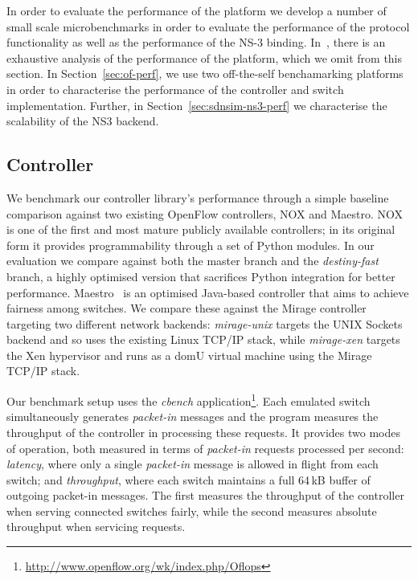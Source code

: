 In order to evaluate the performance of the \sdnsim platform we develop a number
of small scale microbenchmarks in order to evaluate the performance of the \of
protocol functionality as well as the performance of the NS-3 binding.
In~\cite{unikernel}, there is an exhaustive analysis of the performance of the
\mirage platform, which we omit from this section. In Section~\ref{sec:of-perf},
we use two off-the-self \of benchamarking platforms in order to characterise the 
performance of the controller and switch implementation. Further, in
Section~\ref{sec:sdnsim-ns3-perf} we characterise the scalability of the NS3 
backend.


\subsection{\mirage Controller}

We benchmark our controller library's performance through a simple
baseline comparison against two existing OpenFlow controllers, NOX and
Maestro. NOX~\cite{nox} is one of the first and most mature publicly available
\of controllers; in its original form it provides programmability through
a set of Python modules. In our evaluation we compare against both the master
branch and the \emph{destiny-fast} branch, a highly optimised version that
sacrifices Python integration for better performance. Maestro~\cite{maestro}
is an optimised Java-based controller that aims to achieve fairness among
switches. We compare these against the Mirage controller targeting two
different network backends: \emph{mirage-unix} targets the UNIX Sockets
backend and so uses the existing Linux TCP/IP stack, while \emph{mirage-xen}
targets the Xen hypervisor and runs as a domU virtual machine using the Mirage
TCP/IP stack.

Our benchmark setup uses the \emph{cbench}
application\footnote{\url{http://www.openflow.org/wk/index.php/Oflops}}. Each
emulated switch simultaneously generates \emph{packet-in} messages and the
program measures the throughput of the controller in processing these
requests. It provides two modes of operation, both measured in terms of
\emph{packet-in} requests processed per second: \emph{latency}, where only a single
\emph{packet-in} message is allowed in flight from each switch; and
\emph{throughput}, where each switch maintains a full 64\,kB buffer of
outgoing packet-in messages. The first measures the throughput of the
controller when serving connected switches fairly, while the second measures
absolute throughput when servicing requests.
                                                                       
